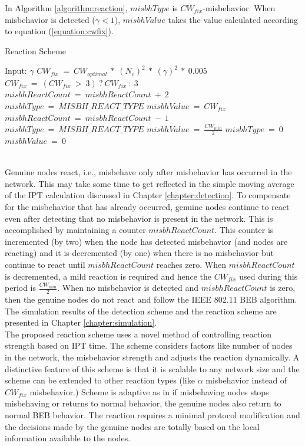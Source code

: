 \documentclass[12pt,letterpaper,english]{article}
\begin{document}
In Algorithm \ref{algorithm:reaction}, $misbhType$ is $CW_{fix}$-misbehavior.
When misbehavior is detected ($\gamma < 1$), $misbhValue$ takes the value calculated according to equation (\ref{equation:cwfix}). 
\begin{algorithm}[t]
\caption{Reaction Scheme}
\label{algorithm:reaction}
\begin{algorithmic}
\STATE Input: $\gamma$
	\STATE $CW_{fix}\ =\ CW_{optimal}\ *\ (N_{c})^2\ *\ (\gamma)^2\ *\ 0.005$
	\STATE $CW_{fix}\ =\ (CW_{fix}\ >\ 3)\ ?\ CW_{fix}\ :\ 3$
	\STATE {}
	\STATE $misbhReactCount\ =\ misbhReactCount\ +\ 2$
	\STATE $misbhType\ =\ MISBH\_REACT\_TYPE$
	\STATE {}
	\STATE $misbhValue\ =\ CW_{fix}$
	\STATE {}
	\STATE $misbhReactCount\ =\ misbhReactCount\ -\ 1$
	\STATE $misbhType\ =\ MISBH\_REACT\_TYPE$
	\STATE $misbhValue\ =\ \frac{CW_{min}}{2}$
\ELSE
	\STATE {}
	\STATE $misbhType\ =\ 0$
	\STATE $misbhValue\ =\ 0$
\ENDIF
\end{algorithmic}
\end{algorithm}
\\
\indent Genuine nodes react, i.e., misbehave only after misbehavior has occurred in the network. 
This may take some time to get reflected in the simple moving average of the IPT calculation discussed in Chapter \ref{chapter:detection}. 
To compensate for the misbehavior that has already occurred, genuine nodes continue to react even after detecting that no misbehavior is present in the network. 
This is accomplished by maintaining a counter $misbhReactCount$. This counter is incremented (by two) when the node has detected misbehavior (and nodes are reacting) and it is decremented (by one) when there is no misbehavior but continue to react until $misbhReactCount$ reaches zero. When $misbhReactCount$ is decremented, a mild reaction is required and hence the $CW_{fix}$ used during this period is $\frac{CW_{min}}{2}$. 
When no misbehavior is detected and $misbhReactCount$ is zero, then the genuine nodes do not react and follow the IEEE 802.11 BEB algorithm.
The simulation results of the detection scheme and the reaction scheme are presented in Chapter \ref{chapter:simulation}.
\\
\indent The proposed reaction scheme uses a novel method of controlling reaction strength based on IPT time. The scheme considers factors like number of nodes in the network, the misbehavior strength and adjusts the reaction dynamically. A distinctive feature of this scheme is that it is scalable to any network size and the scheme can be extended to other reaction types (like $\alpha$ misbehavior instead of $CW_{fix}$ misbehavior.) Scheme is adaptive as in if misbehaving nodes stops misbehaving or returns to normal behavior, the genuine nodes also return to normal BEB behavior. The reaction requires a minimal protocol modification and the decisions made by the genuine nodes are totally based on the local information available to the nodes.
\end{document}
